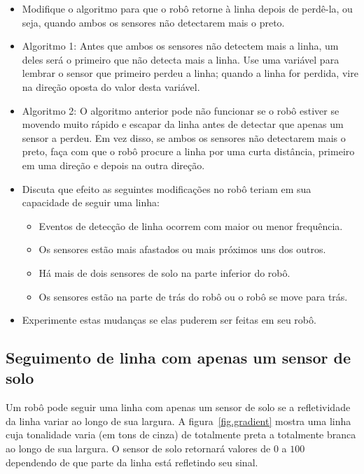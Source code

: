 \begin{framed}
\begin{itemize}
\item Modifique o algoritmo para que o robô retorne à linha depois de perdê-la, ou seja, quando ambos os sensores não detectarem mais o preto.
\item Algoritmo 1: Antes que ambos os sensores não detectem mais a linha, um deles será o primeiro que não detecta mais a linha. Use uma variável para lembrar o sensor que primeiro perdeu a linha; quando a linha for perdida, vire na direção oposta do valor desta variável.
\item Algoritmo 2: O algoritmo anterior pode não funcionar se o robô estiver se movendo muito rápido e escapar da linha antes de detectar que apenas um sensor a perdeu. Em vez disso, se ambos os sensores não detectarem mais o preto, faça com que o robô procure a linha por uma curta distância, primeiro em uma direção e depois na outra direção.
\end{itemize}
\end{framed}

\begin{framed}
\begin{itemize}
\item Discuta que efeito as seguintes modificações no robô teriam em sua capacidade de seguir uma linha:
\begin{itemize}
\item Eventos de detecção de linha ocorrem com maior ou menor frequência.
\item Os sensores estão mais afastados ou mais próximos uns dos outros.
\item Há mais de dois sensores de solo na parte inferior do robô.
\item Os sensores estão na parte de trás do robô ou o robô se move para trás.
\end{itemize}
\item Experimente estas mudanças se elas puderem ser feitas em seu robô.
\end{itemize}
\end{framed}

\subsection{Seguimento de linha com apenas um sensor de solo}

Um robô pode seguir uma linha com apenas um sensor de solo se a refletividade da linha variar ao longo de sua largura. A figura~\ref{fig.gradient} mostra uma linha cuja tonalidade varia (em tons de cinza) de totalmente preta a totalmente branca ao longo de sua largura. O sensor de solo retornará valores de $0$ a $100$ dependendo de que parte da linha está refletindo seu sinal.

